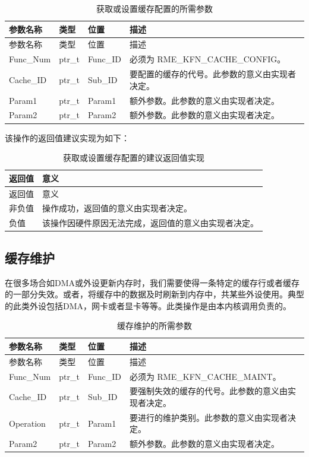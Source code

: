 \begin{xltabular}{\textwidth}{@{}>{\hsize\raggedright\arraybackslash}X>{\hsize\raggedright\arraybackslash}X>{\hsize\raggedright\arraybackslash}X>{\hsize\raggedright\arraybackslash}X@{}}
\caption{获取或设置缓存配置的所需参数}\label{tab:8-27-get-or-set-cache-configuration-parameters}\\
\toprule
参数名称 & 类型 & 位置 & 描述\tabularnewline
\endfirsthead
\toprule
参数名称 & 类型 & 位置 & 描述\tabularnewline
\midrule
\endhead
\bottomrule
\endlastfoot
Func\_Num & ptr\_t & Func\_ID & 必须为 RME\_KFN\_CACHE\_CONFIG。\tabularnewline
Cache\_ID & ptr\_t & Sub\_ID &
要配置的缓存的代号。此参数的意义由实现者决定。\tabularnewline
Param1 & ptr\_t & Param1 &
额外参数。此参数的意义由实现者决定。\tabularnewline
Param2 & ptr\_t & Param2 &
额外参数。此参数的意义由实现者决定。\tabularnewline
\end{xltabular}

该操作的返回值建议实现为如下：

\begin{xltabular}{\textwidth}{@{}>{\hsize\raggedright\arraybackslash}X>{\hsize\raggedright\arraybackslash}X@{}}
\caption{获取或设置缓存配置的建议返回值实现}\label{tab:8-28-get-or-set-cache-configuration-suggested-return-values}\\
\toprule
返回值 & 意义\tabularnewline
\endfirsthead
\toprule
返回值 & 意义\tabularnewline
\midrule
\endhead
\bottomrule
\endlastfoot
    非负值 & 操作成功，返回值的意义由实现者决定。\tabularnewline
    负值 & 该操作因硬件原因无法完成，返回值的意义由实现者决定。\tabularnewline
\end{xltabular}

\subsection{缓存维护}\label{subsec:8-cache-maintenance}

在很多场合如DMA或外设更新内存时，我们需要使得一条特定的缓存行或者缓存的一部分失效。或者，将缓存中的数据及时刷新到内存中，共某些外设使用。典型的此类外设包括DMA，网卡或者显卡等等。此类操作是由本内核调用负责的。

\begin{xltabular}{\textwidth}{@{}>{\hsize\raggedright\arraybackslash}X>{\hsize\raggedright\arraybackslash}X>{\hsize\raggedright\arraybackslash}X>{\hsize\raggedright\arraybackslash}X@{}}
\caption{缓存维护的所需参数}\label{tab:8-29-cache-maintenance-parameters}\\
\toprule
参数名称 & 类型 & 位置 & 描述\tabularnewline
\endfirsthead
\toprule
参数名称 & 类型 & 位置 & 描述\tabularnewline
\midrule
\endhead
\bottomrule
\endlastfoot
Func\_Num & ptr\_t & Func\_ID & 必须为 RME\_KFN\_CACHE\_MAINT。\tabularnewline
Cache\_ID & ptr\_t & Sub\_ID &
要强制失效的缓存的代号。此参数的意义由实现者决定。\tabularnewline
Operation & ptr\_t & Param1 &
要进行的维护类别。此参数的意义由实现者决定。\tabularnewline
Param2 & ptr\_t & Param2 &
额外参数。此参数的意义由实现者决定。\tabularnewline
\end{xltabular}

